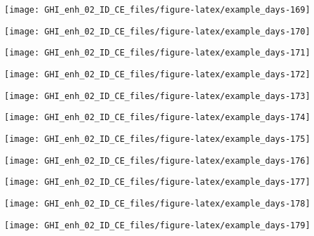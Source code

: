\documentclass[
  10pt,
  a4paper,oneside]{article}
\begin{document}
\begin{center}\texttt{[image: GHI\_enh\_02\_ID\_CE\_files/figure-latex/example\_days-169]} \end{center}

\begin{center}\texttt{[image: GHI\_enh\_02\_ID\_CE\_files/figure-latex/example\_days-170]} \end{center}

\begin{center}\texttt{[image: GHI\_enh\_02\_ID\_CE\_files/figure-latex/example\_days-171]} \end{center}

\begin{center}\texttt{[image: GHI\_enh\_02\_ID\_CE\_files/figure-latex/example\_days-172]} \end{center}

\begin{center}\texttt{[image: GHI\_enh\_02\_ID\_CE\_files/figure-latex/example\_days-173]} \end{center}

\begin{center}\texttt{[image: GHI\_enh\_02\_ID\_CE\_files/figure-latex/example\_days-174]} \end{center}

\begin{center}\texttt{[image: GHI\_enh\_02\_ID\_CE\_files/figure-latex/example\_days-175]} \end{center}

\begin{center}\texttt{[image: GHI\_enh\_02\_ID\_CE\_files/figure-latex/example\_days-176]} \end{center}

\begin{center}\texttt{[image: GHI\_enh\_02\_ID\_CE\_files/figure-latex/example\_days-177]} \end{center}

\begin{center}\texttt{[image: GHI\_enh\_02\_ID\_CE\_files/figure-latex/example\_days-178]} \end{center}

\begin{center}\texttt{[image: GHI\_enh\_02\_ID\_CE\_files/figure-latex/example\_days-179]} \end{center}
\end{document}

